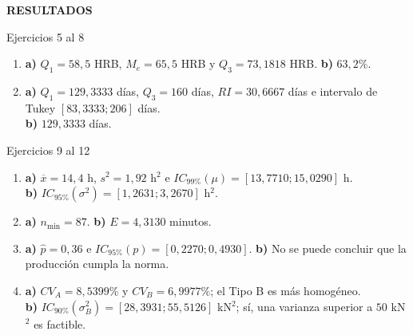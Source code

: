 \documentclass[letterpaper,12pt]{article}
\newenvironment{resultados}{%
    \newpage
    \begin{center}
        \begin{tcolorbox}[
            colback=azulFuerte,
            colframe=azulFuerte,
            colupper=white,
            width=0.8\textwidth,
            center,
            arc=10pt]
            \centering\Large\textbf{RESULTADOS}
        \end{tcolorbox}
    \end{center}
    \small
}{}
\begin{document}
\begin{resultados}
\begin{resultbox}{Ejercicios 5 al 8}
\begin{enumerate}[label=\color{azulFuerte}\bfseries\arabic*.,start=5,leftmargin=*,itemsep=0.75em]
    \item \textbf{a)} $Q_1=58{,}5$ HRB, $M_e=65{,}5$ HRB y $Q_3=73{,}1818$ HRB. \quad
          \textbf{b)} $63{,}2\%$.

    \item \textbf{a)} $Q_1=129{,}3333$ días, $Q_3=160$ días, $RI=30{,}6667$ días e intervalo de Tukey $[83{,}3333;206]$ días. \\
          \textbf{b)} $129{,}3333$ días.
\end{enumerate}
\end{resultbox}

\begin{resultbox}{Ejercicios 9 al 12}
\begin{enumerate}[label=\color{azulFuerte}\bfseries\arabic*.,start=9,leftmargin=*,itemsep=0.75em]
    \item \textbf{a)} $\overline x=14{,}4$ h, $s^2=1{,}92$ h$^2$ e $IC_{99\%}(\mu)=[13{,}7710;15{,}0290]$ h. \\
          \textbf{b)} $IC_{95\%}(\sigma^2)=[1{,}2631;3{,}2670]$ h$^2$.

    \item \textbf{a)} $n_{\min}=87$. \quad
          \textbf{b)} $E=4{,}3130$ minutos.

    \item \textbf{a)} $\widehat p=0{,}36$ e $IC_{95\%}(p)=[0{,}2270;0{,}4930]$. \quad
          \textbf{b)} No se puede concluir que la producción cumpla la norma.

    \item \textbf{a)} $CV_A=8{,}5399\%$ y $CV_B=6{,}9977\%$; el Tipo B es más homogéneo. \\
          \textbf{b)} $IC_{90\%}(\sigma_B^2)=[28{,}3931;55{,}5126]$ kN$^2$; sí, una varianza superior a $50$ kN$^2$ es factible.
\end{enumerate}
\end{resultbox}

\end{resultados}
\end{document}
